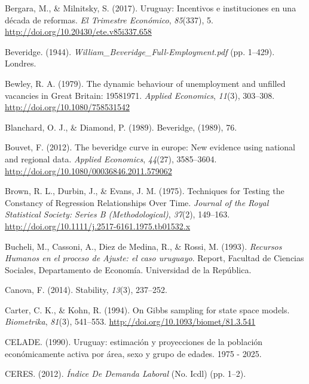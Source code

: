 \documentclass[12pt,oneside]{reedthesis}
\begin{document}
\leavevmode\hypertarget{ref-Bergara2017}{}%
Bergara, M., \& Milnitsky, S. (2017). Uruguay: Incentivos e instituciones en una década de reformas. \emph{El Trimestre Económico}, \emph{85}(337), 5. \url{http://doi.org/10.20430/ete.v85i337.658}

\leavevmode\hypertarget{ref-Beveridge}{}%
Beveridge. (1944). \emph{William\_Beveridge\_Full-Employment.pdf} (pp. 1--429). Londres.

\leavevmode\hypertarget{ref-Bewley1979}{}%
Bewley, R. A. (1979). The dynamic behaviour of unemployment and unfilled vacancies in Great Britain: 19581971. \emph{Applied Economics}, \emph{11}(3), 303--308. \url{http://doi.org/10.1080/758531542}

\leavevmode\hypertarget{ref-Blanchard1989}{}%
Blanchard, O. J., \& Diamond, P. (1989). Beveridge, (1989), 76.

\leavevmode\hypertarget{ref-Bouvet2012}{}%
Bouvet, F. (2012). The beveridge curve in europe: New evidence using national and regional data. \emph{Applied Economics}, \emph{44}(27), 3585--3604. \url{http://doi.org/10.1080/00036846.2011.579062}

\leavevmode\hypertarget{ref-Brown1975}{}%
Brown, R. L., Durbin, J., \& Evans, J. M. (1975). Techniques for Testing the Constancy of Regression Relationships Over Time. \emph{Journal of the Royal Statistical Society: Series B (Methodological)}, \emph{37}(2), 149--163. \url{http://doi.org/10.1111/j.2517-6161.1975.tb01532.x}

\leavevmode\hypertarget{ref-DECON1993}{}%
Bucheli, M., Cassoni, A., Diez de Medina, R., \& Rossi, M. (1993). \emph{Recursos Humanos en el proceso de Ajuste: el caso uruguayo}. Report, Facultad de Ciencias Sociales, Departamento de Economía. Universidad de la República.

\leavevmode\hypertarget{ref-Canova1995}{}%
Canova, F. (2014). Stability, \emph{13}(3), 237--252.

\leavevmode\hypertarget{ref-KarterKohn1994}{}%
Carter, C. K., \& Kohn, R. (1994). On Gibbs sampling for state space models. \emph{Biometrika}, \emph{81}(3), 541--553. \url{http://doi.org/10.1093/biomet/81.3.541}

\leavevmode\hypertarget{ref-Celade1990}{}%
CELADE. (1990). Uruguay: estimación y proyecciones de la población económicamente activa por área, sexo y grupo de edades. 1975 - 2025.

\leavevmode\hypertarget{ref-Ceres2012}{}%
CERES. (2012). \emph{Índice De Demanda Laboral} (No. Icdl) (pp. 1--2).
\end{document}
